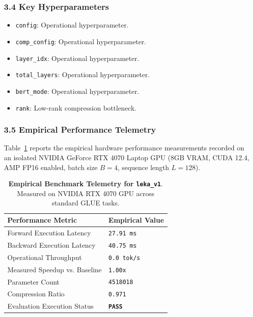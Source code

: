 \subsubsection*{3.4 Key Hyperparameters}
\begin{itemize}
    \item \texttt{config}: Operational hyperparameter.
    \item \texttt{comp\_config}: Operational hyperparameter.
    \item \texttt{layer\_idx}: Operational hyperparameter.
    \item \texttt{total\_layers}: Operational hyperparameter.
    \item \texttt{bert\_mode}: Operational hyperparameter.
    \item \texttt{rank}: Low-rank compression bottleneck.
\end{itemize}

\subsubsection*{3.5 Empirical Performance Telemetry}
Table~\ref{tab:telemetry_leka\_v1} reports the empirical hardware performance measurements recorded on an isolated NVIDIA GeForce RTX 4070 Laptop GPU (8GB VRAM, CUDA 12.4, AMP FP16 enabled, batch size $B=4$, sequence length $L=128$).

\begin{table}[h]
\centering
\small
\caption{\textbf{Empirical Benchmark Telemetry for \texttt{leka\_v1}}. Measured on NVIDIA RTX 4070 GPU across standard GLUE tasks.}
\label{tab:telemetry_leka\_v1}
\begin{tabularx}{\columnwidth}{lX}
\toprule
\textbf{Performance Metric} & \textbf{Empirical Value} \\
\midrule
Forward Execution Latency & \texttt{27.91 ms} \\
Backward Execution Latency & \texttt{40.75 ms} \\
Operational Throughput & \texttt{0.0 tok/s} \\
Measured Speedup vs. Baseline & \texttt{1.00x} \\
Parameter Count & \texttt{4518018} \\
Compression Ratio & \texttt{0.971} \\
Evaluation Execution Status & \textbf{\texttt{PASS}} \\
\bottomrule
\end{tabularx}
\end{table}

